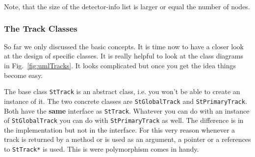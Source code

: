 \documentclass[twoside]{article}
\begin{document}
Note, that the size of the detector-info list is larger or equal the
number of nodes.

\subsubsection{The Track Classes}

So far we only discussed the basic concepts. It is time now to have a
closer look at the design of specific classes. It is really helpful to
look at the class diagrams in Fig.~\ref{fig:umlTracks}. It looks
complicated but once you get the idea things become easy.

The base class \texttt{StTrack} is an abstract class, i.e. you won't
be able to create an instance of it. The two concrete classes are
\texttt{StGlobalTrack} and \texttt{StPrimaryTrack}.  Both have the
\textbf{same} interface as \texttt{StTrack}. Whatever you can do with
an instance of \texttt{StGlobalTrack} you can do with
\texttt{StPrimaryTrack} as well. The difference is in the
implementation but not in the interface. For this very reason whenever
a track is returned by a method or is used as an argument, a pointer
or a references to \texttt{StTrack*} is used. This is were
polymorphism comes in handy.
\end{document}

